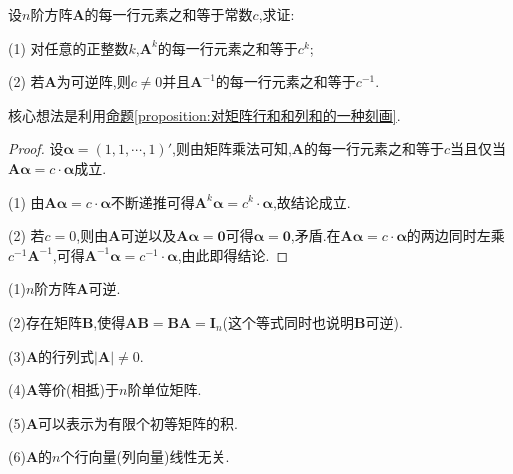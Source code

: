 \documentclass[../../main.tex]{subfiles}%
\begin{document}
\begin{example}
设\(n\)阶方阵\(\boldsymbol{A}\)的每一行元素之和等于常数\(c\),求证:

(1) 对任意的正整数\(k\),\(\boldsymbol{A}^{k}\)的每一行元素之和等于\(c^{k}\);

(2) 若\(\boldsymbol{A}\)为可逆阵,则\(c \neq 0\)并且\(\boldsymbol{A}^{-1}\)的每一行元素之和等于\(c^{-1}\).
\end{example}
\begin{note}
核心想法是利用\hyperref[proposition:对矩阵行和和列和的一种刻画]{命题\ref{proposition:对矩阵行和和列和的一种刻画}}.
\end{note}
\begin{proof}

设\(\boldsymbol{\alpha} = (1,1,\cdots,1)'\),则由矩阵乘法可知,\(\boldsymbol{A}\)的每一行元素之和等于\(c\)当且仅当\(\boldsymbol{A}\boldsymbol{\alpha} = c \cdot \boldsymbol{\alpha}\)成立.

(1) 由\(\boldsymbol{A}\boldsymbol{\alpha} = c \cdot \boldsymbol{\alpha}\)不断递推可得\(\boldsymbol{A}^{k}\boldsymbol{\alpha} = c^{k} \cdot \boldsymbol{\alpha}\),故结论成立.

(2) 若\(c = 0\),则由\(\boldsymbol{A}\)可逆以及\(\boldsymbol{A}\boldsymbol{\alpha} = \boldsymbol{0}\)可得\(\boldsymbol{\alpha} = \boldsymbol{0}\),矛盾.在\(\boldsymbol{A}\boldsymbol{\alpha} = c \cdot \boldsymbol{\alpha}\)的两边同时左乘\(c^{-1}\boldsymbol{A}^{-1}\),可得\(\boldsymbol{A}^{-1}\boldsymbol{\alpha} = c^{-1} \cdot \boldsymbol{\alpha}\),由此即得结论.

\end{proof}

\begin{proposition}[矩阵可逆的等价命题]\label{proposition:矩阵可逆的等价命题}
(1)\(n\)阶方阵\(\boldsymbol{A}\)可逆.

(2)存在矩阵$\boldsymbol{B}$,使得$\boldsymbol{AB}=\boldsymbol{BA}=\boldsymbol{I}_n$(这个等式同时也说明$\boldsymbol{B}$可逆).

(3)\(\boldsymbol{A}\)的行列式\(\vert \boldsymbol{A}\vert\neq0\).

(4)\(\boldsymbol{A}\)等价(相抵)于\(n\)阶单位矩阵.

(5)\(\boldsymbol{A}\)可以表示为有限个初等矩阵的积.

(6)\(\boldsymbol{A}\)的\(n\)个行向量(列向量)线性无关.
\end{proposition}
\end{document}
